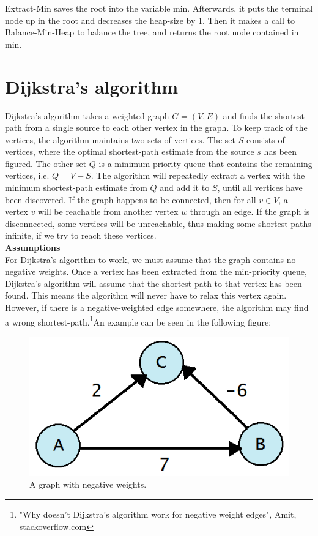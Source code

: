 \documentclass[11pt]{article}
\begin{document}
\noindent Extract-Min saves the root into the variable min. Afterwards, it puts the terminal node up in the root and decreases the heap-size by 1. Then it makes a call to Balance-Min-Heap to balance the tree, and returns the root node contained in min.


\newpage
\section{Dijkstra's algorithm}
Dijkstra's algorithm takes a weighted graph $G = (V, E)$ and finds the shortest path from a single source to each other vertex in the graph. To keep track of the vertices, the algorithm maintains two sets of vertices. The set $S$ consists of vertices, where the optimal shortest-path estimate from the source $s$ has been figured. The other set $Q$ is a minimum priority queue that contains the remaining vertices, i.e. $Q = V - S$. The algorithm will repeatedly extract a vertex with the minimum shortest-path estimate from $Q$ and add it to $S$, until all vertices have been discovered. If the graph happens to be connected, then for all $v \in V $, a vertex $v$ will be reachable from another vertex $w$ through an edge. If the graph is disconnected, some vertices will be unreachable, thus making some shortest paths infinite, if we try to reach these vertices.\\

\noindent 
\textbf{Assumptions}\\
For Dijkstra's algorithm to work, we must assume that the graph contains no negative weights. Once a vertex has been extracted from the min-priority queue, Dijkstra's algorithm will assume that the shortest path to that vertex has been found. This means the algorithm will never have to relax this vertex again. However, if there is a negative-weighted edge somewhere, the algorithm may find a wrong shortest-path.\footnote{"Why doesn't Dijkstra's algorithm work for negative weight edges", Amit, stackoverflow.com}An example can be seen in the following figure:\\

\begin{figure}[H]
\centering
\includegraphics[scale=0.3]{Pictures/Dijkstra - no negative weight.png}
\caption{A graph with negative weights.}
\end{figure}
\end{document}
